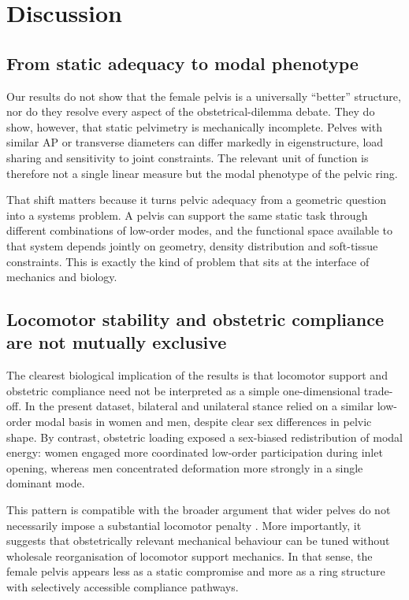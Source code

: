 \documentclass[11pt,a4paper]{article}
\begin{document}
\section{Discussion}

\subsection{From static adequacy to modal phenotype}

Our results do not show that the female pelvis is a universally ``better'' structure, nor do they resolve every aspect of the obstetrical-dilemma debate. They do show, however, that static pelvimetry is mechanically incomplete. Pelves with similar AP or transverse diameters can differ markedly in eigenstructure, load sharing and sensitivity to joint constraints. The relevant unit of function is therefore not a single linear measure but the modal phenotype of the pelvic ring.

That shift matters because it turns pelvic adequacy from a geometric question into a systems problem. A pelvis can support the same static task through different combinations of low-order modes, and the functional space available to that system depends jointly on geometry, density distribution and soft-tissue constraints. This is exactly the kind of problem that sits at the interface of mechanics and biology.

\subsection{Locomotor stability and obstetric compliance are not mutually exclusive}

The clearest biological implication of the results is that locomotor support and obstetric compliance need not be interpreted as a simple one-dimensional trade-off. In the present dataset, bilateral and unilateral stance relied on a similar low-order modal basis in women and men, despite clear sex differences in pelvic shape. By contrast, obstetric loading exposed a sex-biased redistribution of modal energy: women engaged more coordinated low-order participation during inlet opening, whereas men concentrated deformation more strongly in a single dominant mode.

This pattern is compatible with the broader argument that wider pelves do not necessarily impose a substantial locomotor penalty \citep{Warrener2015}. More importantly, it suggests that obstetrically relevant mechanical behaviour can be tuned without wholesale reorganisation of locomotor support mechanics. In that sense, the female pelvis appears less as a static compromise and more as a ring structure with selectively accessible compliance pathways.
\end{document}
